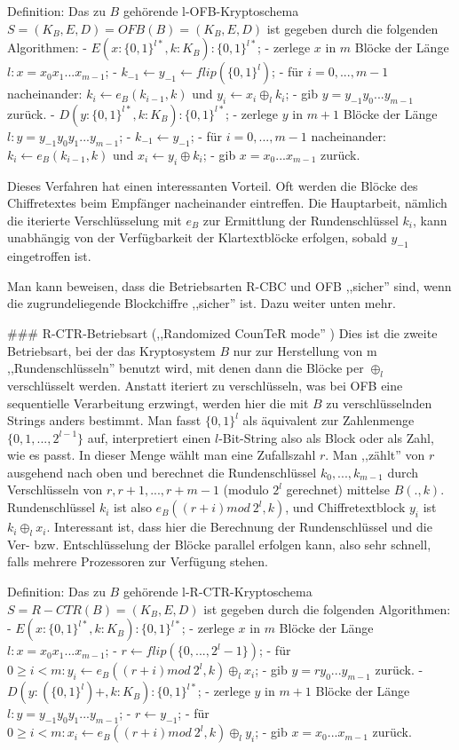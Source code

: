 \documentclass[a4paper]{article}
\begin{document}
\begin{multicols}{3}
Definition: Das zu $B$ gehörende l-OFB-Kryptoschema $S=(K_B,E,D) =OFB(B) =(K_B,E,D)$ ist gegeben durch die folgenden Algorithmen:
- $E(x:\{0,1\}^{l*},k:K_B) :\{0,1\}^{l*}$;
    - zerlege $x$ in $m$ Blöcke der Länge $l:x=x_0 x_1 ...x_{m-1}$;
    - $k_{-1} \leftarrow y_{-1} \leftarrow flip(\{0,1\}^l)$;
    - für $i=0,...,m-1$ nacheinander: $k_i\leftarrow e_B(k_{i-1},k)$ und $y_i\leftarrow x_i\oplus_l k_i$;
    - gib $y=y_{-1} y_0 ...y_{m-1}$ zurück.
- $D(y:\{0,1\}^{l*},k:K_B) :\{0,1\}^{l*}$;
    - zerlege $y$ in $m+1$ Blöcke der Länge $l:y=y_{-1} y_0 y_1 ...y_{m-1}$;
    - $k_{-1} \leftarrow y_{-1}$;
    - für $i=0,...,m-1$ nacheinander: $k_i\leftarrow e_B(k_{i-1} ,k)$ und $x_i\leftarrow y_i\oplus k_i$;
    - gib $x=x_0 ...x_{m-1}$ zurück.

Dieses Verfahren hat einen interessanten Vorteil. Oft werden die Blöcke des Chiffretextes beim Empfänger nacheinander eintreffen. Die Hauptarbeit, nämlich die iterierte Verschlüsselung mit $e_B$ zur Ermittlung der Rundenschlüssel $k_i$, kann unabhängig von der Verfügbarkeit der Klartextblöcke erfolgen, sobald $y_{-1}$ eingetroffen ist.

Man kann beweisen, dass die Betriebsarten R-CBC und OFB ,,sicher'' sind, wenn die zugrundeliegende Blockchiffre ,,sicher'' ist. Dazu weiter unten mehr.

### R-CTR-Betriebsart (,,Randomized CounTeR mode'' )
Dies ist die zweite Betriebsart, bei der das Kryptosystem $B$ nur zur Herstellung von m ,,Rundenschlüsseln'' benutzt wird, mit denen dann die Blöcke per $\oplus_l$ verschlüsselt werden. Anstatt iteriert zu verschlüsseln, was bei OFB eine sequentielle Verarbeitung erzwingt, werden hier die mit $B$ zu verschlüsselnden Strings anders bestimmt. Man fasst $\{0,1\}^l$ als äquivalent zur Zahlenmenge $\{0,1,...,2^{l-1}\}$ auf, interpretiert einen $l$-Bit-String also als Block oder als Zahl, wie es passt. In dieser Menge wählt man  eine Zufallszahl $r$. Man ,,zählt'' von $r$ ausgehend nach oben und berechnet die Rundenschlüssel $k_0,...,k_{m-1}$ durch Verschlüsseln von $r,r+1,...,r+m-1$ (modulo $2^l$ gerechnet) mittelse $B(.,k)$. Rundenschlüssel $k_i$ ist also $e_B((r+i) mod\ 2^l,k)$, und Chiffretextblock $y_i$ ist $k_i\oplus_l x_i$. Interessant ist, dass hier die Berechnung der Rundenschlüssel und die Ver- bzw. Entschlüsselung der Blöcke parallel erfolgen kann, also sehr schnell, falls mehrere Prozessoren zur Verfügung stehen.

Definition: Das zu $B$ gehörende l-R-CTR-Kryptoschema $S=R-CTR(B) = (K_B,E,D)$ ist gegeben durch die folgenden Algorithmen:
- $E(x:\{0,1\}^{l*},k:K_B) :\{0,1\}^{l*}$;
    - zerlege $x$ in $m$ Blöcke der Länge $l:x=x_0 x_1 ...x_{m-1}$;
    - $r\leftarrow flip(\{0,..., 2^l-1\})$;
    - für $0\geq i < m:y_i\leftarrow e_B((r+i) mod\ 2^l,k)\oplus_l x_i$;
    - gib $y=r y_0 ...y_{m-1}$ zurück.
- $D(y: (\{0,1\}^l)+,k:K_B) :\{0,1\}^{l*}$;
    - zerlege $y$ in $m+1$ Blöcke der Länge $l:y=y_{-1} y_0 y_1 ...y_{m-1}$;
    - $r\leftarrow y_{-1}$;
    - für $0\geq i < m:x_i\leftarrow e_B((r+i) mod\ 2^l,k)\oplus_l y_i$;
    - gib $x=x_0 ...x_{m-1}$ zurück.


\end{multicols}
\end{document}
